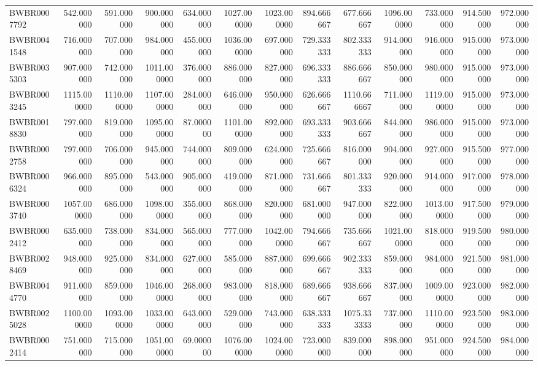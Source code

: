 \begin{longtable}{lrrrrrrrrrrrr}
BWBR0007792 & 542.000000 & 591.000000 & 900.000000 & 634.000000 & 1027.000000 & 1023.000000 & 894.666667 & 677.666667 & 1096.000000 & 733.000000 & 914.500000 & 972.000000 \\
BWBR0041548 & 716.000000 & 707.000000 & 984.000000 & 455.000000 & 1036.000000 & 697.000000 & 729.333333 & 802.333333 & 914.000000 & 916.000000 & 915.000000 & 973.000000 \\
BWBR0035303 & 907.000000 & 742.000000 & 1011.000000 & 376.000000 & 886.000000 & 827.000000 & 696.333333 & 886.666667 & 850.000000 & 980.000000 & 915.000000 & 973.000000 \\
BWBR0003245 & 1115.000000 & 1110.000000 & 1107.000000 & 284.000000 & 646.000000 & 950.000000 & 626.666667 & 1110.666667 & 711.000000 & 1119.000000 & 915.000000 & 973.000000 \\
BWBR0018830 & 797.000000 & 819.000000 & 1095.000000 & 87.000000 & 1101.000000 & 892.000000 & 693.333333 & 903.666667 & 844.000000 & 986.000000 & 915.000000 & 973.000000 \\
BWBR0002758 & 797.000000 & 706.000000 & 945.000000 & 744.000000 & 809.000000 & 624.000000 & 725.666667 & 816.000000 & 904.000000 & 927.000000 & 915.500000 & 977.000000 \\
BWBR0006324 & 966.000000 & 895.000000 & 543.000000 & 905.000000 & 419.000000 & 871.000000 & 731.666667 & 801.333333 & 920.000000 & 914.000000 & 917.000000 & 978.000000 \\
BWBR0003740 & 1057.000000 & 686.000000 & 1098.000000 & 355.000000 & 868.000000 & 820.000000 & 681.000000 & 947.000000 & 822.000000 & 1013.000000 & 917.500000 & 979.000000 \\
BWBR0002412 & 635.000000 & 738.000000 & 834.000000 & 565.000000 & 777.000000 & 1042.000000 & 794.666667 & 735.666667 & 1021.000000 & 818.000000 & 919.500000 & 980.000000 \\
BWBR0028469 & 948.000000 & 925.000000 & 834.000000 & 627.000000 & 585.000000 & 887.000000 & 699.666667 & 902.333333 & 859.000000 & 984.000000 & 921.500000 & 981.000000 \\
BWBR0044770 & 911.000000 & 859.000000 & 1046.000000 & 268.000000 & 983.000000 & 818.000000 & 689.666667 & 938.666667 & 837.000000 & 1009.000000 & 923.000000 & 982.000000 \\
BWBR0025028 & 1100.000000 & 1093.000000 & 1033.000000 & 643.000000 & 529.000000 & 743.000000 & 638.333333 & 1075.333333 & 737.000000 & 1110.000000 & 923.500000 & 983.000000 \\
BWBR0002414 & 751.000000 & 715.000000 & 1051.000000 & 69.000000 & 1076.000000 & 1024.000000 & 723.000000 & 839.000000 & 898.000000 & 951.000000 & 924.500000 & 984.000000 \\

\end{longtable}

